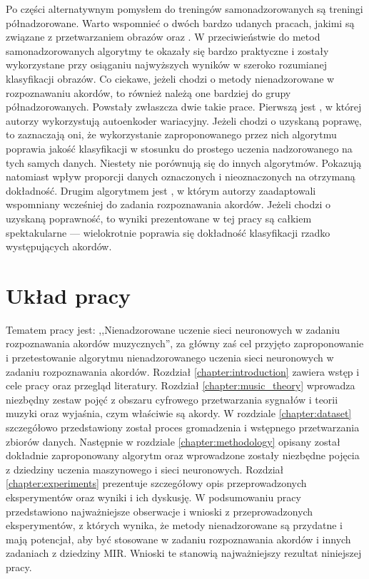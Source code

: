 Po części alternatywnym pomysłem do treningów samonadzorowanych są treningi półnadzorowane. Warto wspomnieć o dwóch bardzo udanych pracach, jakimi są związane z przetwarzaniem obrazów \cite{xie_self-training_2020} oraz \cite{pham_meta_2021}. W przeciwieństwie do metod samonadzorowanych algorytmy te okazały się bardzo praktyczne i zostały wykorzystane przy osiąganiu najwyższych wyników w szeroko rozumianej klasyfikacji obrazów. Co ciekawe, jeżeli chodzi o metody nienadzorowane w rozpoznawaniu akordów, to również należą one bardziej do grupy półnadzorowanych. Powstały zwłaszcza dwie takie prace. Pierwszą jest \cite{wu_semi-supervised_2020}, w której autorzy wykorzystują autoenkoder wariacyjny. Jeżeli chodzi o uzyskaną poprawę, to zaznaczają oni, że wykorzystanie zaproponowanego przez nich algorytmu poprawia jakość klasyfikacji w stosunku do prostego uczenia nadzorowanego na tych samych danych. Niestety nie porównują się do innych algorytmów. Pokazują natomiast wpływ proporcji danych oznaczonych i nieoznaczonych na otrzymaną dokładność. Drugim algorytmem jest \cite{bortolozzo_improving_2021}, w którym autorzy zaadaptowali wspomniany wcześniej \cite{xie_self-training_2020} do zadania rozpoznawania akordów. Jeżeli chodzi o uzyskaną poprawność, to wyniki prezentowane w tej pracy są całkiem spektakularne --- wielokrotnie poprawia się dokładność klasyfikacji rzadko występujących akordów.



\section{Układ pracy}

Tematem pracy jest: ,,Nienadzorowane uczenie sieci neuronowych w zadaniu rozpoznawania akordów muzycznych'', za główny zaś cel przyjęto zaproponowanie i przetestowanie algorytmu nienadzorowanego uczenia sieci neuronowych w zadaniu rozpoznawania akordów. Rozdział \ref{chapter:introduction} zawiera wstęp i cele pracy oraz przegląd literatury. Rozdział \ref{chapter:music_theory} wprowadza niezbędny zestaw pojęć z obszaru cyfrowego przetwarzania sygnałów i teorii muzyki oraz wyjaśnia, czym właściwie są akordy. W rozdziale \ref{chapter:dataset} szczegółowo przedstawiony został proces gromadzenia i wstępnego przetwarzania zbiorów danych. Następnie w rozdziale \ref{chapter:methodology} opisany został dokładnie zaproponowany algorytm oraz wprowadzone zostały niezbędne pojęcia z dziedziny uczenia maszynowego i sieci neuronowych. Rozdział \ref{chapter:experiments} prezentuje szczegółowy opis przeprowadzonych eksperymentów oraz wyniki i ich dyskusję. W podsumowaniu pracy przedstawiono najważniejsze obserwacje i wnioski z przeprowadzonych eksperymentów, z których wynika, że metody nienadzorowane są przydatne i mają potencjał, aby być stosowane w zadaniu rozpoznawania akordów i innych zadaniach z dziedziny MIR. Wnioski te stanowią najważniejszy rezultat niniejszej pracy.
